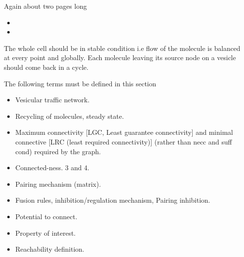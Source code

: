Again about two pages long

\begin{itemize}
\item {}
\item {}
\end{itemize}


The whole cell should be in stable condition i.e flow of the molecule
is balanced at every point and globally. Each molecule leaving its
source node on a vesicle should come back in a cycle.

The following terms must be defined in this section

\begin{itemize}
\item Vesicular traffic network.
\item Recycling of molecules, steady state.
\item Maximum connectivity [LGC, Least guarantee connectivity] and minimal connective [LRC (least required connectivity)] (rather than necc and suff cond) required by the graph. 
\item Connected-ness. 3 and 4.
\item Pairing mechanism (matrix).
\item Fusion rules, inhibition/regulation mechanism, Pairing inhibition.
\item Potential to connect.
\item Property of interest.
\item Reachability definition.
\end{itemize}




